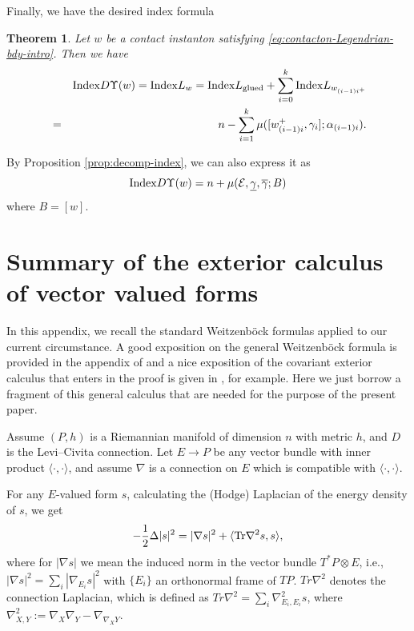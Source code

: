 \documentclass[reqno]{amsart}
\newcommand{\beastar}{\begin{eqnarray*}}
\newcommand{\eeastar}{\end{eqnarray*}}
\theoremstyle{theorem}
\newtheorem{thm}{Theorem}[section]
\theoremstyle{definition}
\numberwithin{equation}{section}
\begin{document}
Finally, we have the desired index formula

\begin{thm}\label{thm:index-formula} Let $w$ be a contact instanton satisfying \eqref{eq:contacton-Legendrian-bdy-intro}. Then
we have
\beastar
& &{\rm Index }D\Upsilon(w) = {\rm Index }L_w
= {\rm Index }L_{\rm glued} + \sum_{i=0}^k{\rm Index }L_{w_{(i-1)i^+}} \\
&=& n - \sum_{i=1}^{k}\mu([w_{(i-1)i}^+,\gamma_i];\alpha_{(i-1)i}). \\
\eeastar
\end{thm}

By Proposition \ref{prop:decomp-index}, we can also express it as
$$
{\rm Index }D\Upsilon(w) = n + \mu(\mathcal{E},\underline \gamma, \overline \gamma;B)
$$
where $B = [w]$.

\appendix

\section{Summary of the exterior calculus of vector valued forms}
\label{append:weitzenbock}


In this appendix, we recall the standard Weitzenb\"ock formulas applied to our
current circumstance. A good exposition on the general Weitzenb\"ock formula is
provided in the appendix of \cite{freed-uhlen} and a nice exposition of the covariant
exterior calculus that enters in the proof is given in \cite[Chapter V, Section1]{wells},
for example. Here we just borrow a fragment of this general calculus that are needed
for the purpose of the present paper.

Assume $(P, h)$ is a Riemannian manifold of dimension $n$ with metric $h$,
and $D$ is the Levi--Civita connection.
Let $E\to P$ be any vector bundle with inner product $\langle\cdot, \cdot\rangle$,
and assume $\nabla$ is a connection on $E$ which is compatible with $\langle\cdot, \cdot\rangle$.

For any $E$-valued form $s$, calculating the (Hodge) Laplacian of the energy density
of $s$,  we get
\beastar
-\frac{1}{2}\Delta|s|^2=|\nabla s|^2+\langle \text{\rm Tr} \nabla^2 s, s\rangle,
\eeastar
where for $|\nabla s|$ we mean the induced norm in the vector bundle $T^*P\otimes E$, i.e.,
$|\nabla s|^2=\sum_i|\nabla_{E_i}s|^2$ with $\{E_i\}$ an orthonormal frame of $TP$.
$Tr\nabla^2$ denotes the connection Laplacian, which is defined as
$Tr\nabla^2=\sum_i\nabla^2_{E_i, E_i}s$,
where $\nabla^2_{X, Y}:=\nabla_X\nabla_Y-\nabla_{\nabla_XY}$.
\end{document}
